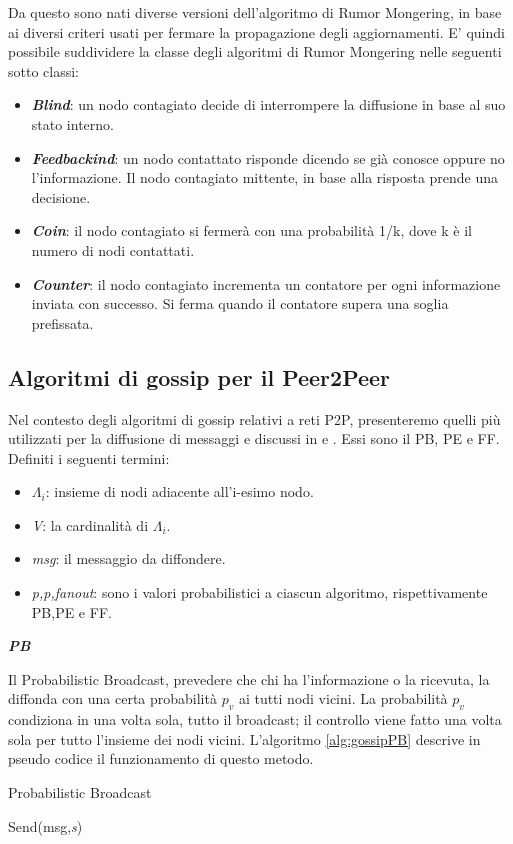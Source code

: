 Da questo sono nati diverse versioni dell’algoritmo di Rumor Mongering, in base ai diversi criteri usati per fermare la propagazione degli aggiornamenti. E’ quindi possibile suddividere la classe degli algoritmi di Rumor Mongering nelle seguenti sotto classi:
\begin{itemize}
	\item \textbf{\textit{Blind}}: un nodo contagiato decide di interrompere la diffusione in base al suo stato interno.
	\item \textbf{\textit{Feedbackind}}: un nodo contattato risponde dicendo se già conosce oppure no l’informazione. Il nodo contagiato mittente, in base alla risposta prende una decisione.
	\item \textbf{\textit{Coin}}: il nodo contagiato si fermerà con una probabilità 1/k, dove k è il numero di nodi contattati.
	\item \textbf{\textit{Counter}}: il nodo contagiato incrementa un contatore per ogni informazione inviata con successo. Si ferma quando il contatore supera una soglia prefissata.
\end{itemize}

\subsection{Algoritmi di gossip per il Peer2Peer}
\label{subsec:alg_p2p}
Nel contesto degli algoritmi di gossip relativi a reti \acs{P2P}, presenteremo quelli più utilizzati per la diffusione di messaggi e discussi in \cite{comparisonGAonRT2012} e \cite{comparisonGAonRT2014-ita}. Essi sono il \acf{PB}, \acf{PE} e \acf{FF}. Definiti i seguenti termini:
\begin{itemize}
	\item $ \varLambda_{i} $: insieme di nodi adiacente all’i-esimo nodo.
	\item \textit{V}: la cardinalità di $ \Lambda_{i} $.
	\item \textit{msg}: il messaggio da diffondere.
	\item \textit{p,p,fanout}: sono i valori probabilistici a ciascun algoritmo, rispettivamente PB,PE e FF.
\end{itemize}
\bigskip

\noindent\textbf{\textit{\acf{PB}}}

Il Probabilistic Broadcast, prevedere che chi ha l'informazione o la ricevuta, la diffonda con una certa probabilità $\mathit{p_v}$ ai tutti nodi vicini. La probabilità $\mathit{p_v}$ condiziona in una volta sola, tutto il broadcast; il controllo viene fatto una volta sola per tutto l'insieme dei nodi vicini. L'algoritmo \ref{alg:gossipPB} descrive in pseudo codice il funzionamento di questo metodo.
\bigskip
\begin{algorithm}[h]
	\caption{Probabilistic Broadcast}\label{alg:gossipPB}
	\begin{algorithmic}[1]
					\State Send(msg,\emph{s})
				\EndFor
			\EndIf
		\EndFunction
	\end{algorithmic}
\end{algorithm}
\bigskip

